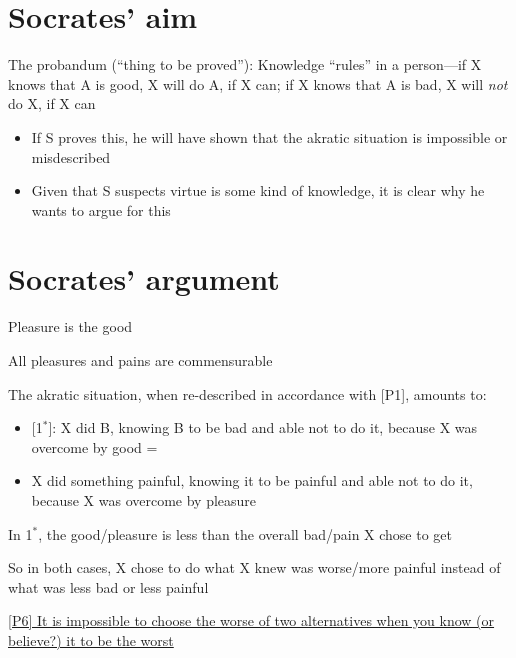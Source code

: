 \documentclass[11pt]{article}
\begin{document}
\section*{Socrates' aim}

\noindent The probandum (``thing to be proved''): Knowledge ``rules'' in a person---if X knows that A is good, X will do A, if X can; if X knows that A is bad, X will \emph{not} do X, if X can

\begin{itemize}\item{If S proves this, he will have shown that the akratic situation is impossible or misdescribed}

\item{Given that S suspects virtue is some kind of knowledge, it is clear why he wants to argue for this}\end{itemize}

\section*{Socrates' argument}

\noindent [P1] Pleasure is the good
\vspace*{2mm}

\noindent [P2] All pleasures and pains are commensurable
\vspace*{2mm}

\noindent [P3] The akratic situation, when re-described in accordance with [P1], amounts to:

\begin{itemize}
\item{[1$^{*}$]: X did B, knowing B to be bad and able not to do it, because X was overcome by good =}
\item{X did something painful, knowing it to be painful and able not to do it, because X was overcome by pleasure}\end{itemize}
\vspace*{2mm}
 
 \noindent [P4] In 1$^{*}$, the good/pleasure is less than the overall bad/pain X chose to get
 \vspace*{2mm}
 
 \noindent [P5] So in both cases, X chose to do what X knew was worse/more painful instead of what was less bad or less painful
 \vspace*{2mm}
 
 \noindent \underline{[P6] It is impossible to choose the worse of two alternatives when you know (or believe?) it to be the worst}
 \vspace*{2mm}
 
\end{document}
